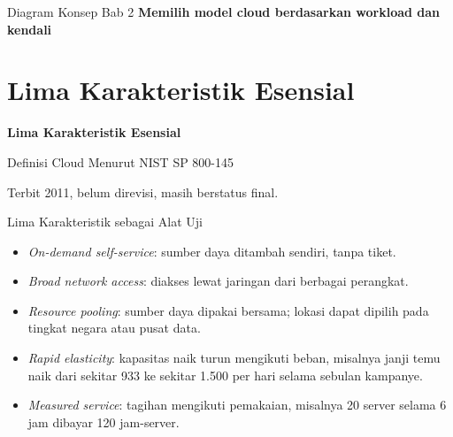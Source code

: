 \documentclass[aspectratio=169, table, 12pt]{beamer}
\begin{document}
\begin{frame}{{\Large Diagram Konsep Bab 2}}
  \centering
  {\small\bfseries Memilih model cloud berdasarkan workload dan kendali}\par\medskip
\end{frame}

\section{Lima Karakteristik Esensial}

\begin{frame}{\hfill}
  \centering
  \Huge{\textbf{Lima Karakteristik Esensial}}
\end{frame}

\begin{frame}{Definisi Cloud Menurut NIST SP 800-145}
  \begin{center}
  \end{center}
  {\footnotesize Terbit 2011, belum direvisi, masih berstatus final.}
\end{frame}

\begin{frame}{Lima Karakteristik sebagai Alat Uji}
  \small
  \begin{itemize}
    \item \textit{On-demand self-service}: sumber daya ditambah sendiri, tanpa tiket.
    \item \textit{Broad network access}: diakses lewat jaringan dari berbagai perangkat.
    \item \textit{Resource pooling}: sumber daya dipakai bersama; lokasi dapat dipilih pada
          tingkat negara atau pusat data.
    \item \textit{Rapid elasticity}: kapasitas naik turun mengikuti beban, misalnya
          janji temu naik dari sekitar 933 ke sekitar 1.500 per hari selama sebulan kampanye.
    \item \textit{Measured service}: tagihan mengikuti pemakaian, misalnya 20 server selama
          6 jam dibayar 120 jam-server.
  \end{itemize}
\end{frame}
\end{document}
